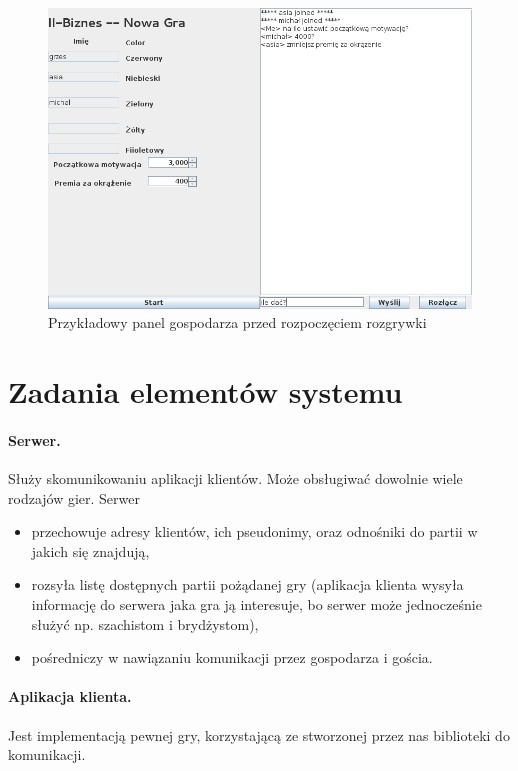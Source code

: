 \documentclass[a4paper, 12pt]{article}
\begin{document}
\begin{figure}
\centering
\includegraphics[scale=0.8]{rysunki/inicjacja.png}
\caption{Przykładowy panel gospodarza przed rozpoczęciem rozgrywki}
\label{fig:inicjacja}
\end{figure}

\section{Zadania elementów systemu}

\paragraph{Serwer.} Służy skomunikowaniu aplikacji klientów. Może obsługiwać dowolnie wiele rodzajów gier.
Serwer
\begin{itemize}
 \item przechowuje adresy klientów, ich pseudonimy, oraz odnośniki do partii w jakich się znajdują,
 \item rozsyła listę dostępnych partii pożądanej gry (aplikacja klienta wysyła informację do serwera jaka gra ją interesuje, bo serwer może jednocześnie służyć np. szachistom i brydżystom),
 \item pośredniczy w nawiązaniu komunikacji przez gospodarza i gościa.
\end{itemize}

\paragraph{Aplikacja klienta.} Jest implementacją pewnej gry, korzystającą ze stworzonej przez nas biblioteki do komunikacji. 
\end{document}
